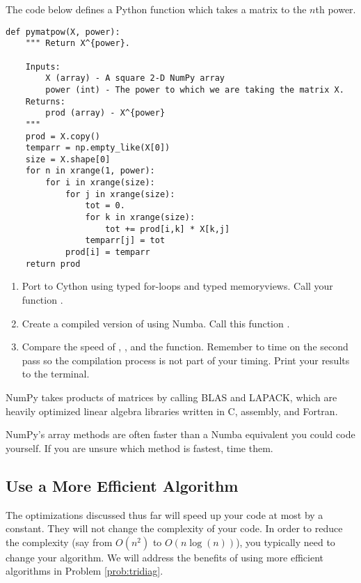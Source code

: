 \begin{problem}
The code below defines a Python function which takes a matrix to the $n$th power.
\begin{lstlisting}
def pymatpow(X, power):
    """ Return X^{power}.

    Inputs:
        X (array) - A square 2-D NumPy array
        power (int) - The power to which we are taking the matrix X.
    Returns:
        prod (array) - X^{power}
    """
    prod = X.copy()
    temparr = np.empty_like(X[0])
    size = X.shape[0]
    for n in xrange(1, power):
        for i in xrange(size):
            for j in xrange(size):
                tot = 0.
                for k in xrange(size):
                    tot += prod[i,k] * X[k,j]
                temparr[j] = tot
            prod[i] = temparr
    return prod
\end{lstlisting}

\begin{enumerate}
\item Port  to Cython using typed for-loops and typed memoryviews. Call your function .
\item Create a compiled version of  using Numba. Call this function .
\item Compare the speed of , ,  and the  function. Remember to time  on the second pass so the compilation process is not part of your timing. Print your results to the terminal.
\end{enumerate}
NumPy takes products of matrices by calling BLAS and LAPACK, which are heavily optimized linear algebra libraries written in C, assembly, and Fortran.
\end{problem}

\begin{warn}
NumPy's array methods are often faster than a Numba equivalent you could code yourself.
If you are unsure which method is fastest, time them.
\end{warn}



\subsection*{Use a More Efficient Algorithm}

The optimizations discussed thus far will speed up your code at most by a constant.
They will not change the complexity of your code.
In order to reduce the complexity (say from $O(n^2)$ to $O(n \log(n))$), you typically need to change your algorithm.
We will address the benefits of using more efficient algorithms in Problem \ref{prob:tridiag}.

